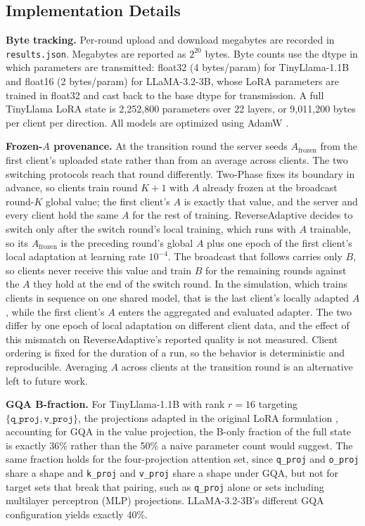 \documentclass[iicol,pdflatex,sn-mathphys-num]{sn-jnl}
\begin{document}
\subsection{Implementation Details}
\label{sec:implementation}
\textbf{Byte tracking.}
Per-round upload and download megabytes are recorded in \texttt{results.json}. Megabytes are reported as $2^{20}$ bytes. Byte counts use the dtype in which parameters are transmitted: float32 (4 bytes/param) for TinyLlama-1.1B and float16 (2 bytes/param) for LLaMA-3.2-3B, whose LoRA parameters are trained in float32 and cast back to the base dtype for transmission. A full TinyLlama LoRA state is 2{,}252{,}800 parameters over 22 layers, or 9{,}011{,}200 bytes per client per direction. All models are optimized using AdamW \cite{loshchilov2019decoupled}.

\textbf{Frozen-$A$ provenance.} At the transition round the server seeds $A_{\text{frozen}}$ from the first client's uploaded state rather than from an average across clients. The two switching protocols reach that round differently. Two-Phase fixes its boundary in advance, so clients train round $K{+}1$ with $A$ already frozen at the broadcast round-$K$ global value; the first client's $A$ is exactly that value, and the server and every client hold the same $A$ for the rest of training. ReverseAdaptive decides to switch only after the switch round's local training, which runs with $A$ trainable, so its $A_{\text{frozen}}$ is the preceding round's global $A$ plus one epoch of the first client's local adaptation at learning rate $10^{-4}$. The broadcast that follows carries only $B$, so clients never receive this value and train $B$ for the remaining rounds against the $A$ they hold at the end of the switch round. In the simulation, which trains clients in sequence on one shared model, that is the last client's locally adapted $A$, while the first client's $A$ enters the aggregated and evaluated adapter. The two differ by one epoch of local adaptation on different client data, and the effect of this mismatch on ReverseAdaptive's reported quality is not measured. Client ordering is fixed for the duration of a run, so the behavior is deterministic and reproducible. Averaging $A$ across clients at the transition round is an alternative left to future work.

\textbf{GQA B-fraction.}
For TinyLlama-1.1B with rank $r{=}16$ targeting $\{\texttt{q\_proj}, \texttt{v\_proj}\}$, the projections adapted in the original LoRA formulation \cite{hu2022lora}, accounting for GQA in the value projection, the B-only fraction of the full state is exactly 36\% rather than the 50\% a naive parameter count would suggest. The same fraction holds for the four-projection attention set, since \texttt{q\_proj} and \texttt{o\_proj} share a shape and \texttt{k\_proj} and \texttt{v\_proj} share a shape under GQA, but not for target sets that break that pairing, such as \texttt{q\_proj} alone or sets including multilayer perceptron (MLP) projections. LLaMA-3.2-3B's different GQA configuration yields exactly 40\%.
\end{document}

